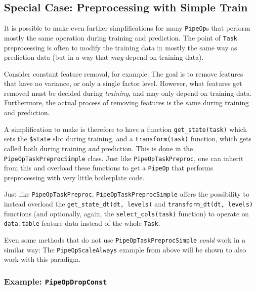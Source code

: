 \documentclass[12pt,]{scrbook}
\begin{document}
\hypertarget{special-case-preprocessing-with-simple-train}{%
\subsection{Special Case: Preprocessing with Simple Train}\label{special-case-preprocessing-with-simple-train}}

It is possible to make even further simplifications for many \texttt{PipeOp}s that perform mostly the same operation during training and prediction.
The point of \texttt{Task} preprocessing is often to modify the training data in mostly the same way as prediction data (but in a way that \emph{may} depend on training data).

Consider constant feature removal, for example: The goal is to remove features that have no variance, or only a single factor level.
However, what features get removed must be decided during \emph{training}, and may only depend on training data.
Furthermore, the actual process of removing features is the same during training and prediction.

A simplification to make is therefore to have a function \texttt{get\_state(task)} which sets the \texttt{\$state} slot during training, and a \texttt{transform(task)} function, which gets called both during training \emph{and} prediction.
This is done in the \texttt{PipeOpTaskPreprocSimple} class.
Just like \texttt{PipeOpTaskPreproc}, one can inherit from this and overload these functions to get a \texttt{PipeOp} that performs preprocessing with very little boilerplate code.

Just like \texttt{PipeOpTaskPreproc}, \texttt{PipeOpTaskPreprocSimple} offers the possibility to instead overload the \texttt{get\_state\_dt(dt,\ levels)} and \texttt{transform\_dt(dt,\ levels)} functions (and optionally, again, the \texttt{select\_cols(task)} function) to operate on \texttt{data.table} feature data instead of the whole \texttt{Task}.

Even some methods that do not use \texttt{PipeOpTaskPreprocSimple} \emph{could} work in a similar way: The \texttt{PipeOpScaleAlways} example from above will be shown to also work with this paradigm.

\hypertarget{example-pipeopdropconst}{%
\subsubsection{\texorpdfstring{Example: \texttt{PipeOpDropConst}}{Example: PipeOpDropConst}}\label{example-pipeopdropconst}}
\end{document}
